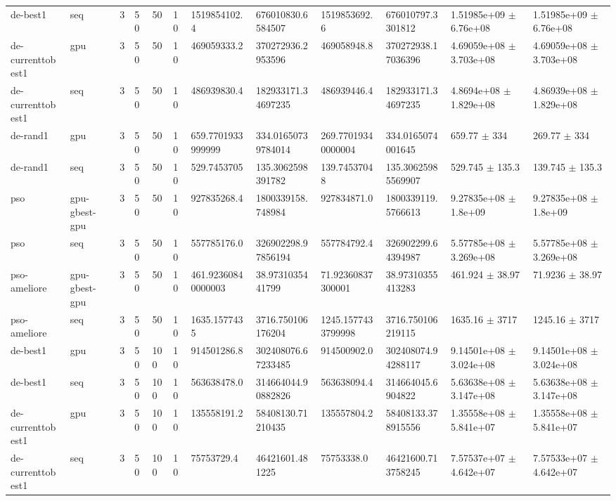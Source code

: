 \begin{table}[t]
\begin{tabular}{llllllllllll}
de-best1 & seq & 3 & 50 & 50 & 10 & 1519854102.4 & 676010830.6584507 & 1519853692.6 & 676010797.3301812 & 1.51985e+09 $\pm$ 6.76e+08 & 1.51985e+09 $\pm$ 6.76e+08 \\
de-currenttobest1 & gpu & 3 & 50 & 50 & 10 & 469059333.2 & 370272936.2953596 & 469058948.8 & 370272938.17036396 & 4.69059e+08 $\pm$ 3.703e+08 & 4.69059e+08 $\pm$ 3.703e+08 \\
de-currenttobest1 & seq & 3 & 50 & 50 & 10 & 486939830.4 & 182933171.34697235 & 486939446.4 & 182933171.34697235 & 4.8694e+08 $\pm$ 1.829e+08 & 4.86939e+08 $\pm$ 1.829e+08 \\
de-rand1 & gpu & 3 & 50 & 50 & 10 & 659.7701933999999 & 334.01650739784014 & 269.77019340000004 & 334.0165074001645 & 659.77 $\pm$ 334 & 269.77 $\pm$ 334 \\
de-rand1 & seq & 3 & 50 & 50 & 10 & 529.7453705 & 135.3062598391782 & 139.74537048 & 135.30625985569907 & 529.745 $\pm$ 135.3 & 139.745 $\pm$ 135.3 \\
pso & gpu-gbest-gpu & 3 & 50 & 50 & 10 & 927835268.4 & 1800339158.748984 & 927834871.0 & 1800339119.5766613 & 9.27835e+08 $\pm$ 1.8e+09 & 9.27835e+08 $\pm$ 1.8e+09 \\
pso & seq & 3 & 50 & 50 & 10 & 557785176.0 & 326902298.97856194 & 557784792.4 & 326902299.64394987 & 5.57785e+08 $\pm$ 3.269e+08 & 5.57785e+08 $\pm$ 3.269e+08 \\
pso-ameliore & gpu-gbest-gpu & 3 & 50 & 50 & 10 & 461.92360840000003 & 38.9731035441799 & 71.92360837300001 & 38.97310355413283 & 461.924 $\pm$ 38.97 & 71.9236 $\pm$ 38.97 \\
pso-ameliore & seq & 3 & 50 & 50 & 10 & 1635.1577435 & 3716.750106176204 & 1245.1577433799998 & 3716.750106219115 & 1635.16 $\pm$ 3717 & 1245.16 $\pm$ 3717 \\
de-best1 & gpu & 3 & 50 & 100 & 10 & 914501286.8 & 302408076.67233485 & 914500902.0 & 302408074.94288117 & 9.14501e+08 $\pm$ 3.024e+08 & 9.14501e+08 $\pm$ 3.024e+08 \\
de-best1 & seq & 3 & 50 & 100 & 10 & 563638478.0 & 314664044.90882826 & 563638094.4 & 314664045.6904822 & 5.63638e+08 $\pm$ 3.147e+08 & 5.63638e+08 $\pm$ 3.147e+08 \\
de-currenttobest1 & gpu & 3 & 50 & 100 & 10 & 135558191.2 & 58408130.71210435 & 135557804.2 & 58408133.378915556 & 1.35558e+08 $\pm$ 5.841e+07 & 1.35558e+08 $\pm$ 5.841e+07 \\
de-currenttobest1 & seq & 3 & 50 & 100 & 10 & 75753729.4 & 46421601.481225 & 75753338.0 & 46421600.713758245 & 7.57537e+07 $\pm$ 4.642e+07 & 7.57533e+07 $\pm$ 4.642e+07 \\

\end{tabular}
\end{table}
